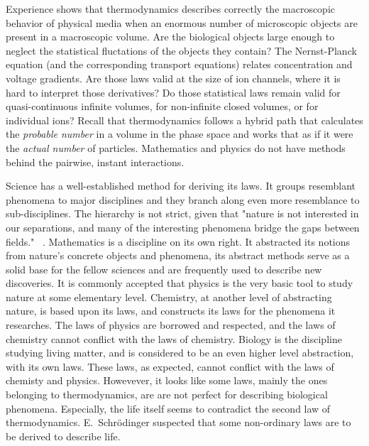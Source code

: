 {
Experience shows that thermodynamics describes correctly the
macroscopic behavior of physical media when an enormous 
number of microscopic objects are present in a macroscopic
volume. Are the biological objects large enough to
neglect the statistical fluctations of the objects
they contain? The Nernst-Planck equation (and the corresponding transport equations) relates concentration and voltage gradients.
Are those laws valid at the size of ion channels, where
it is hard to interpret those derivatives?
Do those statistical laws remain valid for quasi-continuous 
infinite volumes, for non-infinite closed volumes,
or for individual ions? Recall that thermodynamics 
follows a hybrid path that calculates the \textit{probable number}
in a volume in the phase space and works that as if it were
the \textit{actual number} of particles. 
Mathematics and physics do not have methods behind the
pairwise, instant interactions.
}


Science has a well-established method for deriving its laws. It groups resemblant phenomena to major disciplines and they branch along even more resemblance to sub-disciplines.
The hierarchy is not strict, given that "{nature is not interested in our separations, and many of the interesting phenomena bridge the gaps between fields.}" ~\cite{FeynmanThinking:1980}.
Mathematics is a discipline on its own right. It abstracted its notions from nature's concrete objects and phenomena, its abstract methods serve as a solid base for the fellow sciences and are frequently used to describe new discoveries.
It is commonly accepted that physics is  the very basic tool to study nature at some elementary level.
Chemistry, at another level of abstracting nature, is based upon its laws, and constructs its laws for the phenomena it researches.
The laws of physics are borrowed and respected, and the laws of chemistry cannot conflict with the laws of chemistry.
Biology is the discipline studying living matter, and is considered to be an even higher level abstraction, with its own laws. These laws, as expected, cannot conflict with the laws of chemisty and physics.
Howevever, it looks like some laws, mainly the ones belonging to thermodynamics, are are not perfect for describing biological phenomena. Especially, the life itself seems to contradict 
the second law of thermodynamics. E.~Schrödinger suspected that 
some non-ordinary laws are to be derived to describe life.

